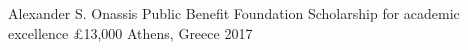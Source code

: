 

\begin{cvhonors}
  \cvhonor
    {Alexander S. Onassis Public Benefit Foundation}%
    {Scholarship for academic excellence £13,000}%
    {Athens, Greece}%
    {2017}%
\end{cvhonors}
